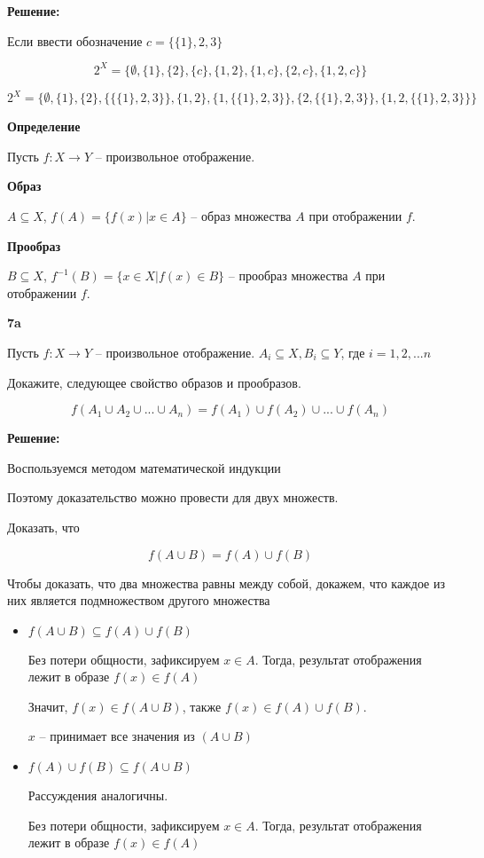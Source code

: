 \documentclass{article}
\begin{document}
\textbf{Решение:}

Если ввести обозначение $c = \{\{1\}, 2, 3\}$ 

$$2^X = \{\emptyset, \{1\}, \{2\}, \{c\}, \{1, 2\}, \{1, c\}, \{2, c\}, \{1, 2, c\}\}$$

$$2^X = \{\emptyset, \{1\}, \{2\}, \{  \{\{1\}, 2, 3\} \}, \{1, 2\}, \{1, \{\{1\}, 2, 3\} \}, \{2, \{\{1\}, 2, 3\}\}, \{1, 2, \{\{1\}, 2, 3\}\}\}$$

\newpage

\textbf{Определение}

Пусть $f: X \rightarrow Y$ -- произвольное отображение.

\textbf{Образ}

$A \subseteq X$, $f(A) = \{f(x) | x \in A\}$ -- образ множества $A$ при отображении $f$. 

\textbf{Прообраз}

$B \subseteq X$, $f^{-1}(B) = \{ x \in X | f(x) \in B\}$ -- прообраз множества $A$ при отображении $f$. 

\bigskip

\textbf{7a}

Пусть $f: X \rightarrow Y$ -- произвольное отображение. $A_i \subseteq X, B_i \subseteq Y$, где $i = 1, 2, ... n$

Докажите, следующее свойство образов и прообразов. 

$$f(A_1 \cup A_2 \cup ... \cup A_n) = f(A_1) \cup f(A_2) \cup ... \cup f(A_n)$$

\textbf{Решение:}

Воспользуемся методом математической индукции 

Поэтому доказательство можно провести для двух множеств. 

Доказать, что 

$$f(A \cup B) = f(A) \cup f(B)$$

Чтобы доказать, что два множества равны между собой, докажем, что каждое из них является подмножеством другого множества

\begin{itemize}
    \item $f(A \cup B) \subseteq f(A) \cup f(B)$
    
    Без потери общности, зафиксируем $x \in A$. Тогда, результат отображения лежит в образе $f(x) \in f(A)$
    
    Значит,  $f(x) \in f(A \cup B)$, также $f(x) \in f(A) \cup f(B)$.
    
    $x$ -- принимает все значения из $(A \cup B)$
    
    \item $f(A) \cup f(B) \subseteq  f(A \cup B)$
    
    Рассуждения аналогичны. 
    
    Без потери общности, зафиксируем $x \in A$. Тогда, результат отображения лежит в образе $f(x) \in f(A)$
    
    
    
\end{itemize}
\end{document}
